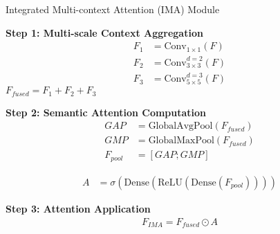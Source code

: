 \begin{algorithm}
\caption{Integrated Multi-context Attention (IMA) Module}

\textbf{Step 1: Multi-scale Context Aggregation} \\
\begin{align*}
F_1 &= \text{Conv}_{1\times1}(F) \\
F_2 &= \text{Conv}_{3\times3}^{d=2}(F) \\
F_3 &= \text{Conv}_{5\times5}^{d=3}(F)
\end{align*}
$F_{fused} = F_1 + F_2 + F_3$

\textbf{Step 2: Semantic Attention Computation} \\
\begin{align*}
GAP &= \text{GlobalAvgPool}(F_{fused}) \\
GMP &= \text{GlobalMaxPool}(F_{fused}) \\
F_{pool} &= [GAP; GMP]
\end{align*}

\begin{align*}
A &= \sigma(\text{Dense}(\text{ReLU}(\text{Dense}(F_{pool}))))
\end{align*}

\textbf{Step 3: Attention Application} \\
\begin{align*}
F_{IMA} = F_{fused} \odot A
\end{align*}

\end{algorithm}
